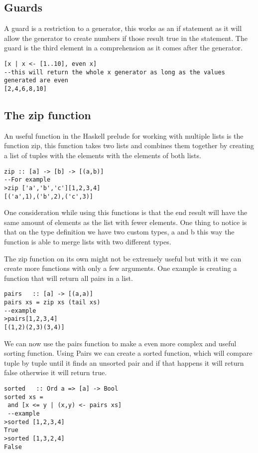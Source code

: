 \documentclass[12pt, oneside]{article}
\begin{document}
\subsection{Guards}
A guard is a restriction to a generator, this works as an if statement as it will allow the generator to create numbers if those result true in the statement. The guard is the third element in a comprehension as it comes after the generator.
\begin{lstlisting}
[x | x <- [1..10], even x]
--this will return the whole x generator as long as the values generated are even
[2,4,6,8,10]
\end{lstlisting}
\subsection{The zip function}
An useful function in the Haskell prelude for working with multiple lists is the function zip, this function takes two lists and combines them together by creating a list of tuples with the elements with the elements of both lists.
\begin{lstlisting}
zip :: [a] -> [b] -> [(a,b)]
--For example
>zip ['a','b','c'][1,2,3,4]
[('a',1),('b',2),('c',3)]
\end{lstlisting}
One consideration while using this functions is that the end result will have the same amount of elements as the list with fewer elements. One thing to notice is that on the type definition we have two custom types, a and b this way the function is able to merge lists with two different types.

The zip function on its own might not be extremely useful but with it we can create more functions with only a few arguments. One example is creating a function that will return all pairs in a list.
\begin{lstlisting}
pairs   :: [a] -> [(a,a)]
pairs xs = zip xs (tail xs)
--example
>pairs[1,2,3,4]
[(1,2)(2,3)(3,4)]
\end{lstlisting}

We can now use the pairs function to make a even more complex and useful sorting function. Using Pairs we can create a sorted function, which will compare tuple by tuple until it finds an unsorted pair and if that happens it will return false otherwise it will return true.
\begin{lstlisting}
sorted   :: Ord a => [a] -> Bool
sorted xs =
 and [x <= y | (x,y) <- pairs xs] 
 --example
>sorted [1,2,3,4]
True
>sorted [1,3,2,4]
False
\end{lstlisting}
\end{document}
